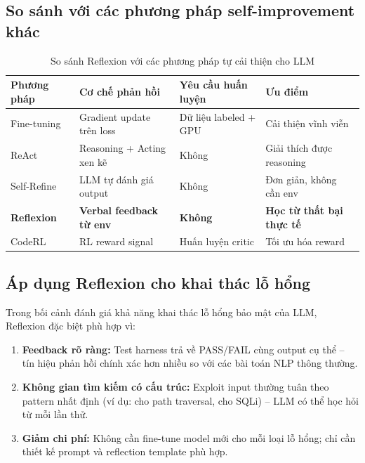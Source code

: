 \documentclass{nt521report}
\begin{document}
\subsection{So sánh với các phương pháp self-improvement khác}

\begin{table}[H]
  \centering
  \caption{So sánh Reflexion với các phương pháp tự cải thiện cho LLM}
  \label{tab:self-improve-compare}
  \begin{tabularx}{\textwidth}{l X X X}
    \toprule
    \textbf{Phương pháp} & \textbf{Cơ chế phản hồi} & \textbf{Yêu cầu huấn luyện} & \textbf{Ưu điểm} \\
    \midrule
    Fine-tuning          & Gradient update trên loss  & Dữ liệu labeled + GPU      & Cải thiện vĩnh viễn \\
    ReAct \cite{yao2023react} & Reasoning + Acting xen kẽ & Không & Giải thích được reasoning \\
    Self-Refine \cite{madaan2023selfrefine} & LLM tự đánh giá output & Không & Đơn giản, không cần env \\
    \textbf{Reflexion} \cite{shinn2023reflexion} & \textbf{Verbal feedback từ env} & \textbf{Không} & \textbf{Học từ thất bại thực tế} \\
    CodeRL \cite{le2022coderl} & RL reward signal & Huấn luyện critic & Tối ưu hóa reward \\
    \bottomrule
  \end{tabularx}
\end{table}

\subsection{Áp dụng Reflexion cho khai thác lỗ hổng}

Trong bối cảnh đánh giá khả năng khai thác lỗ hổng bảo mật của LLM, Reflexion đặc biệt phù hợp vì:

\begin{enumerate}
  \item \textbf{Feedback rõ ràng:} Test harness trả về PASS/FAIL cùng output cụ thể -- tín hiệu phản hồi chính xác hơn nhiều so với các bài toán NLP thông thường.
  \item \textbf{Không gian tìm kiếm có cấu trúc:} Exploit input thường tuân theo pattern nhất định (ví dụ:  cho path traversal,  cho SQLi) -- LLM có thể học hỏi từ mỗi lần thử.
  \item \textbf{Giảm chi phí:} Không cần fine-tune model mới cho mỗi loại lỗ hổng; chỉ cần thiết kế prompt và reflection template phù hợp.
\end{enumerate}
\end{document}
